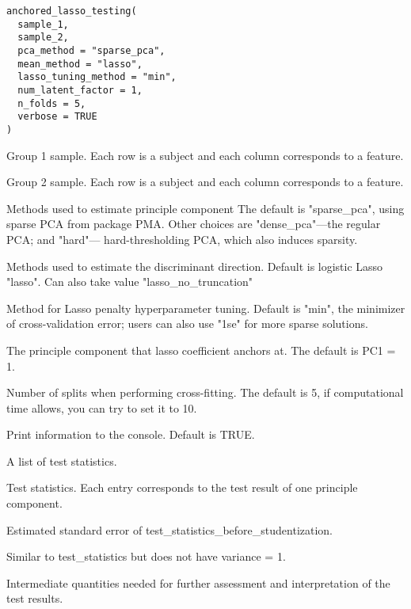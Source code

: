 \documentclass[a4paper]{book}
\begin{document}
%
\begin{Usage}
\begin{verbatim}
anchored_lasso_testing(
  sample_1,
  sample_2,
  pca_method = "sparse_pca",
  mean_method = "lasso",
  lasso_tuning_method = "min",
  num_latent_factor = 1,
  n_folds = 5,
  verbose = TRUE
)
\end{verbatim}
\end{Usage}
%
\begin{Arguments}
\begin{ldescription}
\item[\code{sample\_1}] Group 1 sample. Each row is a subject and each column corresponds to a feature.

\item[\code{sample\_2}] Group 2 sample. Each row is a subject and each column corresponds to a feature.

\item[\code{pca\_method}] Methods used to estimate principle component The default is "sparse\_pca", using sparse PCA from package PMA. Other choices are "dense\_pca"---the regular PCA; and "hard"--- hard-thresholding PCA, which also induces sparsity.

\item[\code{mean\_method}] Methods used to estimate the discriminant direction. Default is logistic Lasso "lasso". Can also take value "lasso\_no\_truncation"

\item[\code{lasso\_tuning\_method}] Method for Lasso penalty hyperparameter tuning. Default is "min", the minimizer of cross-validation error; users can also use "1se" for more sparse solutions.

\item[\code{num\_latent\_factor}] The principle component that lasso coefficient anchors at. The default is PC1 = 1.

\item[\code{n\_folds}] Number of splits when performing cross-fitting. The default is 5, if computational time allows, you can try to set it to 10.

\item[\code{verbose}] Print information to the console. Default is TRUE.
\end{ldescription}
\end{Arguments}
%
\begin{Value}
A list of test statistics.
\begin{ldescription}
\item[\code{test\_statistics}] Test statistics. Each entry corresponds to the test result of one principle component.
\item[\code{standard\_error}] Estimated standard error of test\_statistics\_before\_studentization.
\item[\code{test\_statistics\_before\_studentization}] Similar to test\_statistics but does not have variance = 1.
\item[\code{split\_data}] Intermediate quantities needed for further assessment and interpretation of the test results.
\end{ldescription}
\end{Value}
\end{document}
